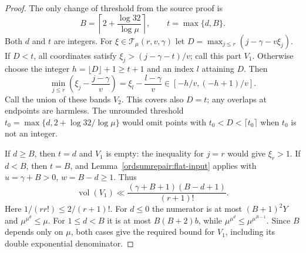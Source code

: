 \begin{proof}
The only change of threshold from the source proof is
\begin{equation}
 B=\left\lceil2+\frac{\log32}{\log\mu}\right\rceil,
 \qquad t=\max\{d,B\}.
 \label{ordsumrepair:threshold}
\end{equation}
Both $d$ and $t$ are integers. For $\xi\in\mathcal T_\mu(r,v,\gamma)$
let $D=\max_{j\leq r}(j-\gamma-v\xi_j)$.
If $D<t$, all coordinates satisfy
$\xi_j>(j-\gamma-t)/v$; call this part $V_1$.
Otherwise choose the integer $h=\lfloor D\rfloor+1\geq t+1$ and
an index $l$ attaining $D$. Then
\begin{equation}
 \min_{j\leq r}\left(\xi_j-\frac{j-\gamma}{v}\right)
 =\xi_l-\frac{l-\gamma}{v}
 \in[-h/v,(-h+1)/v].
 \label{ordsumrepair:band}
\end{equation}
Call the union of these bands $V_2$. This covers also $D=t$;
any overlaps at endpoints are harmless. The unrounded threshold
$t_0=\max\{d,2+\log32/\log\mu\}$ would omit points with
$t_0<D<\lceil t_0\rceil$ when $t_0$ is not an integer.

If $d\geq B$, then $t=d$ and $V_1$ is empty: the inequality for
$j=r$ would give $\xi_r>1$.
If $d<B$, then $t=B$, and Lemma~\ref{ordsumrepair:flat-input}
applies with $u=\gamma+B>0$, $w=B-d\geq1$. Thus
\begin{equation}
 \operatorname{vol}(V_1)
 \ll\frac{(\gamma+B+1)(B-d+1)}{(r+1)!}.
 \label{ordsumrepair:v1}
\end{equation}
Here $1/(r r!)\leq2/(r+1)!$. For $d\leq0$ the numerator is at most
$(B+1)^2Y$ and $\mu^{\mu^d}\leq\mu$. For $1\leq d<B$ it is at
most $B(B+2)b$, while $\mu^{\mu^d}\leq\mu^{\mu^{B-1}}$.
Since $B$ depends only on $\mu$, both cases give the required
bound for $V_1$, including its double exponential denominator.


\end{proof}
